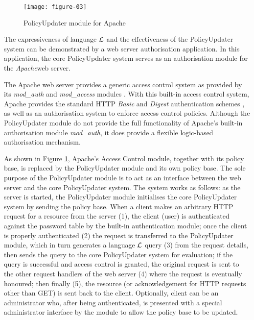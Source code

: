 \documentclass[global,twocolumn,final]{svjour}
\begin{document}
    \begin{figure}[ht]
      \begin{center}
        \texttt{[image: figure-03]}
        \caption{PolicyUpdater module for Apache}
        \label{fig-3}
      \end{center}
    \end{figure}

    The expressiveness of language $\cal{L}$ and the effectiveness of the
    PolicyUpdater system can be demonstrated by a web server authorisation
    application. In this application, the core PolicyUpdater system serves as
    an authorisation module for the {\em Apache}\footnotemark web server.


    The Apache web server provides a generic access control system as provided
    by its {\em mod\_auth} and {\em mod\_access} modules \cite{AP,LAU}. With
    this built-in access control system, Apache provides the standard HTTP
    {\em Basic} and {\em Digest} authentication schemes \cite{HTTP2}, as well
    as an authorisation system to enforce access control policies. Although the
    PolicyUpdater module do not provide the full functionality of Apache's
    built-in authorisation module {\em mod\_auth}, it does provide a flexible
    logic-based authorisation mechanism.

    As shown in Figure \ref{fig-3}, Apache's Access Control module, together
    with its policy base, is replaced by the PolicyUpdater module and its own
    policy base. The sole purpose of the PolicyUpdater module is to act as an
    interface between the web server and the core PolicyUpdater system. The
    system works as follows: as the server is started, the PolicyUpdater
    module initialises the core PolicyUpdater system by sending the policy
    base. When a client makes an arbitrary HTTP request for a resource from
    the server (1), the client (user) is authenticated against the password
    table by the built-in authentication module; once the client is properly
    authenticated (2) the request is transferred to the PolicyUpdater module,
    which in turn generates a language ${\cal L}$ query (3) from the request
    details, then sends the query to the core PolicyUpdater system for
    evaluation; if the query is successful and access control is granted,
    the original request is sent to the other request handlers of the web
    server (4) where the request is eventually honoured; then finally (5),
    the resource (or acknowledgement for HTTP requests other than GET) is sent
    back to the client. Optionally, client can be an administrator who,
    after being authenticated, is presented with a special administrator
    interface by the module to allow the policy base to be updated.
\end{document}
